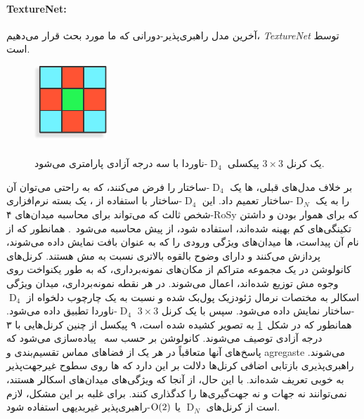 \paragraph{TextureNet:}
آخرین مدل راهبری‌پذیر-دورانی که ما مورد بحث قرار می‌دهیم، \emph{TextureNet} توسط \citet{huang2019texturenet} است.
\begin{figure}
    \centering
    \includegraphics[width=.16\textwidth]{figures/3x3_D4_invariant_kernel.pdf}
    \captionsetup{width=.21\textwidth}
    \caption{\small
        \\
        یک کرنل $3\times3$ پیکسلی $\operatorname{D}_4$-ناوردا با سه درجه آزادی پارامتری می‌شود.
    }
    \label{fig:3x3_D4_invariant_kernel}
\end{figure}%
بر خلاف مدل‌های قبلی، ها یک $\operatorname{D}_4$-ساختار را فرض می‌کنند، که به راحتی می‌توان آن را به یک $\operatorname{D}_N$-ساختار تعمیم داد.
این $\operatorname{D}_4$-ساختار با استفاده از ، یک بسته نرم‌افزاری شخص ثالث که می‌تواند برای محاسبه میدان‌های ۴-RoSy که برای هموار بودن و داشتن تکینگی‌های کم بهینه شده‌اند، استفاده شود، از پیش محاسبه می‌شود~\cite{Huang2018QuadriFlow}.
همانطور که از نام آن پیداست، ها میدان‌های ویژگی ورودی را که به عنوان بافت نمایش داده می‌شوند، پردازش می‌کنند و دارای وضوح بالقوه بالاتری نسبت به مش هستند.
کرنل‌های کانولوشن در یک مجموعه متراکم از مکان‌های نمونه‌برداری، که به طور یکنواخت روی وجوه مش توزیع شده‌اند، اعمال می‌شوند.
در هر نقطه نمونه‌برداری، میدان ویژگی اسکالر به مختصات نرمال ژئودزیک پول‌بک شده و نسبت به یک چارچوب دلخواه از $\operatorname{D}_4$-ساختار نمایش داده می‌شود.
سپس با یک کرنل $3\times3$ $\operatorname{D}_4$-ناوردا تطبیق داده می‌شود.
همانطور که در شکل~\ref{fig:3x3_D4_invariant_kernel} به تصویر کشیده شده است، ۹ پیکسل از چنین کرنل‌هایی با ۳ درجه آزادی توصیف می‌شوند.
کانولوشن بر حسب سه \onexone\ پیاده‌سازی می‌شود که پاسخ‌های آنها متعاقباً در هر یک از فضاهای مماس تقسیم‌بندی و agregaste می‌شوند.
راهبری‌پذیری بازتابی اضافی کرنل‌ها دلالت بر این دارد که ها روی سطوح غیرجهت‌پذیر به خوبی تعریف شده‌اند.
با این حال، از آنجا که ویژگی‌های  میدان‌های اسکالر هستند، نمی‌توانند نه جهات و نه جهت‌گیری‌ها را کدگذاری کنند.
برای غلبه بر این مشکل، لازم است از کرنل‌های $\operatorname{D}_N$ یا $\operatorname{O}(2)$-راهبری‌پذیر غیربدیهی استفاده شود.